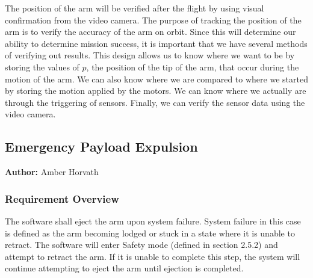 \documentclass[letterpaper,10pt]{article}
\begin{document}
The position of the arm will be verified after the flight by using visual confirmation from the video 
camera. The purpose of tracking the position of the arm is to verify the accuracy of the arm on orbit. 
Since this will determine our ability to determine mission success, it is important that we have several 
methods of verifying out results. This design allows us to know where we want to be by storing the values
 of \(p\), the position of the tip of the arm, that occur during the motion of the arm. We can also know 
where we are compared to where we started by storing the motion applied by the motors. We can know where 
we actually are through the triggering of sensors. Finally, we can verify the sensor data using the video
 camera.

\subsection{Emergency Payload Expulsion}
\textbf{Author:} Amber Horvath
\subsubsection{Requirement Overview}
The software shall eject the arm upon system failure. 
System failure in this case is defined as the arm becoming lodged or stuck in a state where it is unable to retract.
The software will enter Safety mode (defined in section 2.5.2) and attempt to retract the arm. If it is unable to complete this step,
 the system will continue attempting to eject the arm until ejection is completed.
\end{document}
